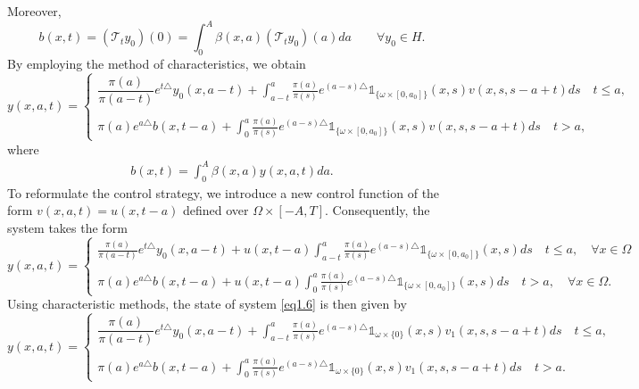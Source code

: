 \documentclass[10pt, a4]{amsart}
\theoremstyle{plain}
\theoremstyle{definition}
\theoremstyle{remark}
\numberwithin{equation}{section}
\begin{document}
Moreover,
$$b(x,t)=(\mathcal{T}_t y_0)(0)=\int_0^A\beta (x,a) (\mathcal{T}_t y_0)(a)da \qquad \forall y_0\in H.$$
By employing the method of characteristics, we obtain
\begin{equation}\label{eq2.5}
y(x,a,t)=\left\lbrace
\begin{array}{ll}
\dfrac{\pi(a)}{\pi(a-t)}e^{t\triangle}y_{0}(x,a-t)+\displaystyle\int_{a-t}^{a}\frac{\pi(a)}{\pi(s)}e^{(a-s)\triangle}\mathds{1}_{\lbrace\omega\times[0,a_0]\rbrace}(x,s)v(x,s,s-a+t)ds\quad t\leq a,\\
\\\pi(a)e^{a\triangle}b(x,t-a)+\displaystyle\int_{0}^{a}\frac{\pi(a)}{\pi(s)}e^{(a-s)\triangle}\mathds{1}_{\lbrace\omega\times[0,a_0]\rbrace}(x,s) v(x,s,s-a+t)ds\quad t> a,
\end{array}
\right.
\end{equation}
where
\begin{align*}
    b(x,t)=\displaystyle\int_{0}^{A}\beta(x,a)  y(x,a,t)da.
\end{align*}
To reformulate the control strategy, we introduce a new control function of the form $v(x,a,t)=u(x,t-a)$ defined over $\Omega\times [-A,T].$ Consequently, the system takes the form
\begin{equation}\label{eq2.6}
y(x,a,t)=\left\lbrace
\begin{array}{ll}
\frac{\pi(a)}{\pi(a-t)}e^{t\triangle}y_{0}(x,a-t)+u(x,t-a)\displaystyle\int_{a-t}^{a}\frac{\pi(a)}{\pi(s)}e^{(a-s)\triangle}\mathds{1}_{\lbrace\omega\times[0,a_0]\rbrace}(x,s)ds\quad t\leq a,\quad \forall x\in \Omega\\
\\\pi(a)e^{a\triangle}b(x,t-a)+u(x,t-a)\displaystyle\int_{0}^{a}\frac{\pi(a)}{\pi(s)}e^{(a-s)\triangle}\mathds{1}_{\lbrace\omega\times[0,a_0]\rbrace}(x,s)ds\quad t> a, \quad \forall x\in \Omega.
\end{array}
\right.
\end{equation}
Using characteristic methods, the state of system \eqref{eq1.6} is then given by
\begin{equation}\label{ee4.7}
y(x,a,t)=\left\lbrace
\begin{array}{ll}
\dfrac{\pi(a)}{\pi(a-t)}e^{t\triangle}y_{0}(x,a-t)+\displaystyle\int_{a-t}^{a}\frac{\pi(a)}{\pi(s)}e^{(a-s)\triangle}\mathds{1}_{\omega\times \lbrace 0\rbrace}(x,s)v_1(x,s,s-a+t)ds\quad t\leq a,\\
\\\pi(a)e^{a\triangle}b(x,t-a)+\displaystyle\int_{0}^{a}\frac{\pi(a)}{\pi(s)}e^{(a-s)\triangle}\mathds{1}_{\omega\times \lbrace 0\rbrace}(x,s) v_1(x,s,s-a+t)ds\quad t> a.
\end{array}
\right.
\end{equation}
\end{document}
